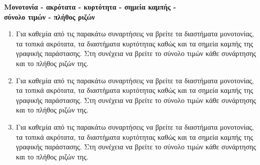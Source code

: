 \begin{center}
{\Large \textbf{Μονοτονία - ακρότατα - κυρτότητα - σημεία καμπής - \\σύνολο τιμών - πλήθος ριζών}}
\end{center}
\begin{enumerate}
\item Για καθεμία από τις παρακάτω συναρτήσεις να βρείτε τα διαστήματα μονοτονίας, τα τοπικά ακρότατα, τα διαστήματα κυρτότητας καθώς και τα σημεία καμπής της γραφικής παράστασης. Στη συνέχεια να βρείτε το σύνολο τιμών κάθε συνάρτησης και το πλήθος ριζών της.

\item Για καθεμία από τις παρακάτω συναρτήσεις να βρείτε τα διαστήματα μονοτονίας, τα τοπικά ακρότατα, τα διαστήματα κυρτότητας καθώς και τα σημεία καμπής της γραφικής παράστασης. Στη συνέχεια να βρείτε το σύνολο τιμών κάθε συνάρτησης και το πλήθος ριζών της.

\item Για καθεμία από τις παρακάτω συναρτήσεις να βρείτε τα διαστήματα μονοτονίας, τα τοπικά ακρότατα, τα διαστήματα κυρτότητας καθώς και τα σημεία καμπής της γραφικής παράστασης. Στη συνέχεια να βρείτε το σύνολο τιμών κάθε συνάρτησης και το πλήθος ριζών της.

\end{enumerate}
